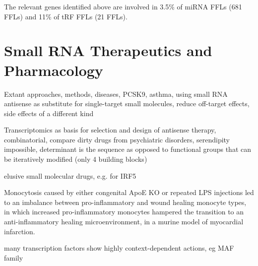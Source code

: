 The relevant genes identified above are involved in 3.5\% of miRNA FFLs (681 FFLs) and 11\% of tRF FFLs (21 FFLs). 

\section{Small RNA Therapeutics and Pharmacology} \label{sec:discussion:therapy}
Extant approaches, methods, diseases, PCSK9, asthma, using small RNA antisense as substitute for single-target small molecules, reduce off-target effects, side effects of a different kind

Transcriptomics as basis for selection and design of antisense therapy, combinatorial, compare dirty drugs from psychiatric disorders, serendipity impossible, determinant is the sequence as opposed to functional groups that can be iteratively modified (only 4 building blocks)

elusive small molecular drugs, e.g. for IRF5 \cite{Almuttaqi2019}

Monocytosis caused by either congenital ApoE KO or repeated LPS injections led to an imbalance between pro-inflammatory and wound healing monocyte types, in which increased pro-inflammatory monocytes hampered the transition to an anti-inflammatory healing microenvironment, in a murine model of myocardial infarction.\cite{Panizzi2010}

many transcription factors show highly context-dependent actions, eg MAF family \cite{Hamada2020}
